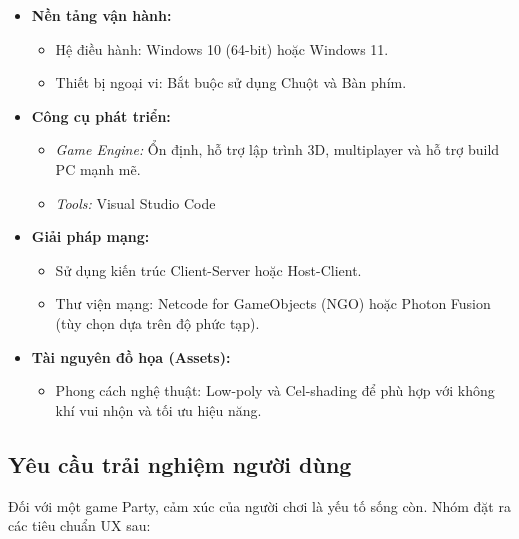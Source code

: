 \begin{itemize}
    \item \textbf{Nền tảng vận hành:}
        \begin{itemize}
            \item Hệ điều hành: Windows 10 (64-bit) hoặc Windows 11.
            \item Thiết bị ngoại vi: Bắt buộc sử dụng Chuột và Bàn phím.
        \end{itemize}
    \item \textbf{Công cụ phát triển:}
        \begin{itemize}
            \item \textit{Game Engine:} Ổn định, hỗ trợ lập trình 3D, multiplayer và hỗ trợ build PC mạnh mẽ.
            \item \textit{Tools:} Visual Studio Code
        \end{itemize}
    \item \textbf{Giải pháp mạng:}
        \begin{itemize}
            \item Sử dụng kiến trúc Client-Server hoặc Host-Client.
            \item Thư viện mạng: Netcode for GameObjects (NGO) hoặc Photon Fusion (tùy chọn dựa trên độ phức tạp).
        \end{itemize}
    \item \textbf{Tài nguyên đồ họa (Assets):}
        \begin{itemize}
            \item Phong cách nghệ thuật: Low-poly và Cel-shading để phù hợp với không khí vui nhộn và tối ưu hiệu năng.
        \end{itemize}
\end{itemize}

\subsection{Yêu cầu trải nghiệm người dùng}

Đối với một game Party, cảm xúc của người chơi là yếu tố sống còn. Nhóm đặt ra các tiêu chuẩn UX sau:

